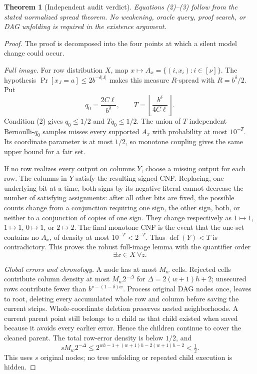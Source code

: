 \documentclass[11pt]{article}
\newtheorem{theorem}{Theorem}
\begin{document}
\begin{theorem}[Independent audit verdict]
Equations (2)--(3) follow from the stated normalized spread theorem.  No
weakening, oracle query, proof search, or DAG unfolding is required in the
existence argument.
\end{theorem}

\begin{proof}
The proof is decomposed into the four points at which a silent model change
could occur.

\emph{Full image.}  For row distribution $X$, map
$x\mapsto A_x=\{(i,x_i):i\in[\nu]\}$.  The hypothesis
$\Pr[x_J=a]\le2b^{-\delta|J|}$ makes this measure
$R$-spread with $R=b^\delta/2$.  Put
\[
 q_0=\frac{2C\ell}{b^\delta},
 \qquad T=\left\lfloor\frac{b^\delta}{4C\ell}\right\rfloor.
\]
Condition (2) gives $q_0\le1/2$ and $Tq_0\le1/2$.  The union of $T$
independent Bernoulli-$q_0$ samples misses every supported $A_x$ with
probability at most $10^{-T}$.  Its coordinate parameter is at most $1/2$,
so monotone coupling gives the same upper bound for a fair set.

If no row realizes every output on columns $Y$, choose a missing output for
each row.  The columns in $Y$ satisfy the resulting signed CNF.  Replacing,
one underlying bit at a time, both signs by its negative literal cannot
decrease the number of satisfying assignments: after all other bits are
fixed, the possible counts change from a conjunction requiring one sign,
the other sign, both, or neither to a conjunction of copies of one sign.
They change respectively as $1\mapsto1$, $1\mapsto1$,
$0\mapsto1$, or $2\mapsto2$.  The final monotone CNF is the event that the
one-set contains no $A_x$, of density at most $10^{-T}<2^{-T}$.  Thus
$\operatorname{def}(Y)<T$ is contradictory.  This proves the robust
full-image lemma with the quantifier order
\[
                    \exists x\in X\ \forall z.           \tag{4}
\]

\emph{Global errors and chronology.}  A node has at most $M_w$ cells.
Rejected cells contribute column density at most $M_w2^{-\Delta}$ for
$\Delta=2(w+1)h+2$; unsecured rows contribute fewer than
$b^{\nu-(1-\delta)w}$.  Process original DAG nodes once, leaves to root,
deleting every accumulated whole row and column before saving the current
strips.  Whole-coordinate deletion preserves nested neighborhoods.  A
current parent point still belongs to a child as that child existed when
saved because it avoids every earlier error.  Hence the children continue
to cover the cleaned parent.  The total row-error density is below $1/2$,
and
\[
 sM_w2^{-\Delta}
 \le2^{wh-1+(w+1)h-2(w+1)h-2}<\tfrac12.                \tag{5}
\]
This uses $s$ original nodes; no tree unfolding or repeated child execution
is hidden.


\end{proof}
\end{document}
